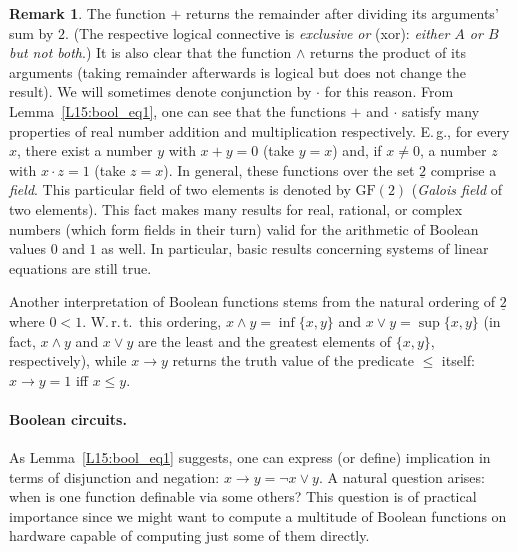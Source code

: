 \documentclass[12pt,notitlepage]{article}
\theoremstyle{plain}
\theoremstyle{definition}
\newtheorem{rem}[thm]{Remark}
\theoremstyle{plain}
\newcommand{\ul}[1]{\underline{#1}}
\newcommand{\1}{\mathbf{1}}
\newcommand{\0}{\mathbf{0}}
\begin{document}
\begin{rem}\label{bool:ord_field}
The function ${+}$ returns the remainder after dividing its arguments' sum by $2$. (The respective logical connective is \emph{exclusive or} (xor): \emph{either $A$ or $B$ but not both}.)
It is also clear that the function ${\wedge}$ returns the product of its arguments (taking remainder afterwards is logical but does not change the result). We will sometimes denote conjunction by ${\cdot}$ for this reason. From Lemma~\ref{L15:bool_eq1}, one can see that the functions ${+}$ and ${\cdot}$ satisfy many properties of real number addition and multiplication respectively. E.\,g., for every $x$, there exist a number $y$ with $x + y = 0$ (take $y = x$) and, if $x\neq 0$, a number $z$ with $x \cdot z = 1$ (take $z = x$). In general, these functions over the set $\ul{2}$ comprise a \emph{field}. This particular field of two elements is denoted by $\mathrm{GF}(2)$ (\emph{Galois field} of two elements). This fact makes many results for real, rational, or complex numbers (which form fields in their turn) valid for the arithmetic of Boolean values $0$ and $1$ as well. In particular, basic results concerning systems of linear equations are still true.

Another interpretation of Boolean functions stems from the natural ordering of $\ul{2}$ where $0 < 1$. W.\,r.\,t.\ this ordering, $x \wedge y = \inf \{x, y\}$ and $x \vee y = \sup \{x, y\}$ (in fact, $x \wedge y$ and $x \vee y$ are the least and the greatest elements of $\{x,y\}$, respectively), while $x \to y$ returns the truth value of the predicate ${\leq}$ itself: $x \to y = 1$ iff $x \leq y$.
\end{rem}


\paragraph{Boolean circuits.} As Lemma~\ref{L15:bool_eq1} suggests, one can express (or define) implication in terms of disjunction and negation: $x \to y = \neg x \vee y$. A natural question arises: when is one function  definable via some others? This question is of practical importance since we might want to compute a multitude of Boolean functions on hardware  capable of computing just some of them directly.
\end{document}
